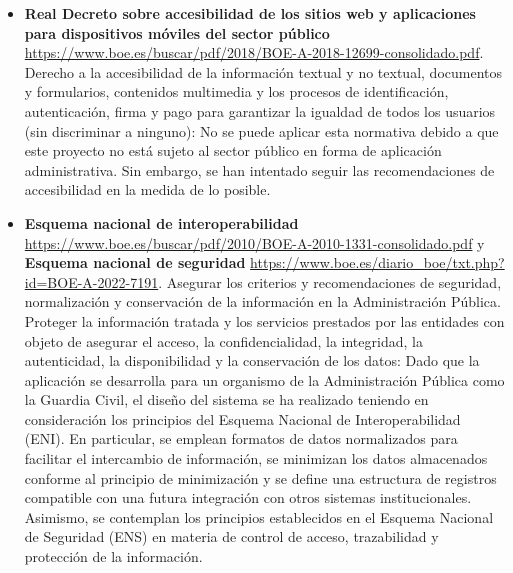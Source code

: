 \documentclass[12pt,a4paper,onecolumn,oneside]{report}
\begin{document}
\begin{itemize}
    \item \textbf{Real Decreto sobre accesibilidad de los sitios web y aplicaciones para dispositivos móviles del sector público} \url{https://www.boe.es/buscar/pdf/2018/BOE-A-2018-12699-consolidado.pdf}. Derecho a la accesibilidad de la información textual y no textual, documentos y formularios, contenidos multimedia y los procesos de identificación, autenticación, firma y pago para garantizar la igualdad de todos los usuarios (sin discriminar a ninguno): No se puede aplicar esta normativa debido a que este proyecto no está sujeto al sector público en forma de aplicación administrativa. Sin embargo, se han intentado seguir las recomendaciones de accesibilidad en la medida de lo posible.
    
    \item \textbf{Esquema nacional de interoperabilidad} \url{https://www.boe.es/buscar/pdf/2010/BOE-A-2010-1331-consolidado.pdf} y \textbf{Esquema nacional de seguridad} \url{https://www.boe.es/diario_boe/txt.php?id=BOE-A-2022-7191}. Asegurar los criterios y recomendaciones de seguridad, normalización y conservación de la información en la Administración Pública. Proteger la información tratada y los servicios prestados por las entidades con objeto de asegurar el acceso, la confidencialidad, la integridad, la autenticidad, la disponibilidad y la conservación de los datos: Dado que la aplicación se desarrolla para un organismo de la Administración Pública como la Guardia Civil, el diseño del sistema se ha realizado teniendo en consideración los principios del Esquema Nacional de Interoperabilidad (ENI). En particular, se emplean formatos de datos normalizados para facilitar el intercambio de información, se minimizan los datos almacenados conforme al principio de minimización y se define una estructura de registros compatible con una futura integración con otros sistemas institucionales. Asimismo, se contemplan los principios establecidos en el Esquema Nacional de Seguridad (ENS) en materia de control de acceso, trazabilidad y protección de la información.
    

\end{itemize}
\end{document}
